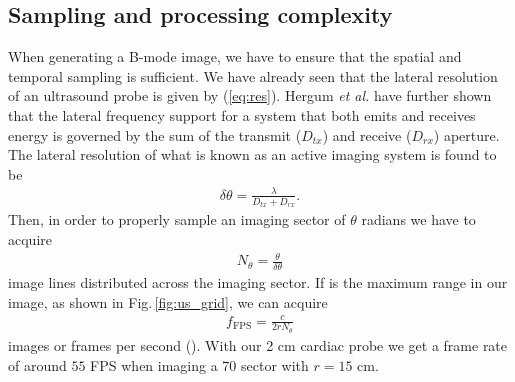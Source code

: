 \subsection{Sampling and processing complexity}
When generating a B-mode image, we have to ensure that the spatial and temporal sampling is sufficient. We have already seen that the lateral resolution of an ultrasound probe is given by (\ref{eq:res}).  Hergum \textit{et al.} \cite{Hergum2009} have further shown that the lateral frequency support for a system that both emits and receives energy is governed by the sum of the transmit ($D_{tx}$) and receive ($D_{rx}$) aperture. The lateral resolution of what is known as an active imaging system is found to be
\begin{align}
\delta\theta = \frac{\lambda}{D_{tx} + D_{rx}}.
\end{align}
Then, in order to properly sample an imaging sector of $\theta$ radians we have to acquire 
\begin{align}
N_\theta = \frac{\theta}{\delta\theta}
\end{align}
image lines distributed across the imaging sector. If  is the maximum range in our image, as shown in Fig.\,\ref{fig:us_grid}, we can acquire
\begin{align}
f_{\text{FPS}} = \frac{c}{2rN_\theta}
\end{align} 
images or frames per second (). With our 2 cm cardiac probe we get a frame rate of around $55$ FPS when imaging a 70\degree{} sector with $r=15$ cm.

